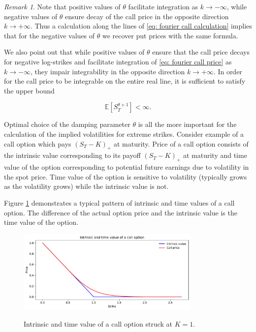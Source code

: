 \documentclass[12pt,twoside]{article}
\theoremstyle{plain}
\theoremstyle{plain}
\theoremstyle{definition}
\theoremstyle{remark}
\newtheorem{remark}[proposition]{Remark}
\numberwithin{equation}{section}
\begin{document}
\begin{remark}
Note that positive values of $\theta$ facilitate integration as $k \rightarrow -\infty$, while negative values of $\theta$ ensure decay of the call price in the opposite direction $k \rightarrow + \infty$. Thus a calculation along the lines of \eqref{eq: fourier call calculation} implies that for the negative values of $\theta$ we recover put prices with the same formula.
\end{remark}

We also point out that while positive values of $\theta$ ensure that the call price decays for negative log-strikes and facilitate integration of \eqref{eq: fourier call price} as $k\rightarrow - \infty$, they impair integrability in the opposite direction $k \rightarrow +\infty$. In order for the call price to be integrable on the entire real line, it is sufficient to satisfy the upper bound

$$
\mathbb{E} \left[S_{T}^{\theta+1}\right]<\infty.
$$

Optimal choice of the damping parameter $\theta$ is all the more important for the calculation of the implied volatilities for extreme strikes. Consider example of a call option which pays $(S_T-K)_+$ at maturity. Price of a call option consists of the intrinsic value corresponding to its payoff $(S_T-K)_+$ at maturity and time value of the option corresponding to potential future earnings due to volatility in the spot price. Time value of the option is sensitive to volatility (typically grows as the volatility grows) while the intrinsic value is not.

Figure \ref{fig: intrinsic and time value of the option} demonstrates a typical pattern of intrinsic and time values of a call option. The difference of the actual option price and the intrinsic value is the time value of the option.

\begin{figure}[H]
\centering
\includegraphics[width=0.8\textwidth]{figures/intrinsic.pdf} \\
\caption{Intrinsic and time value of a call option struck at $K=1$.}
\label{fig: intrinsic and time value of the option}
\end{figure}
\end{document}
